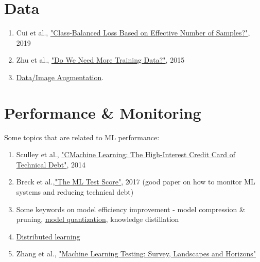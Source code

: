 \documentclass[12pt,letterpaper]{article}
\begin{document}
\section*{Data}
\begin{enumerate}
    \item Cui et al., \href{https://arxiv.org/abs/1901.05555}{"Class-Balanced Loss Based on Effective Number of Samples?"}, 2019
    \item Zhu et al., 
    \href{https://arxiv.org/abs/1503.01508}{"Do We Need More Training Data?"}, 2015
    \item \href{https://d2l.ai/chapter_computer-vision/image-augmentation.html}{Data/Image Augmentation}.
\end{enumerate}
\section*{Performance \& Monitoring}
Some topics that are related to ML performance:
\begin{enumerate}
    \item Sculley et al., 
    \href{https://storage.googleapis.com/pub-tools-public-publication-data/pdf/43146.pdf}{"CMachine Learning:
The High-Interest Credit Card of Technical Debt"}, 2014
    \item Breck et al.,\href{https://storage.googleapis.com/pub-tools-public-publication-data/pdf/aad9f93b86b7addfea4c419b9100c6cdd26cacea.pdf}{"The ML Test Score"}, 2017 (good paper on how to monitor ML systems and reducing technical debt)
    \item Some keywords on model efficiency improvement - model compression & pruning, \href{https://blogs.nvidia.com/blog/2020/05/14/tensorfloat-32-precision-format/}{model quantization}, knowledge distillation
    \item \href{https://pytorch.org/tutorials/beginner/dist_overview.html}{Distributed learning}
    \item Zhang et al., \href{https://arxiv.org/abs/1906.10742}{"Machine Learning Testing: Survey, Landscapes and Horizons"}
\end{enumerate}
\end{document}
